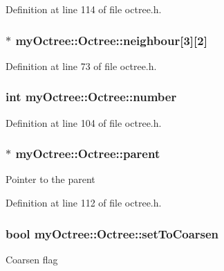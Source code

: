 Definition at line 114 of file octree.\+h.

\hypertarget{classmy_octree_1_1_octree_a667ca17260eb69985476f64fe877b626}{}
\subsubsection[{neighbour}]{$\ast$ my\+Octree\+::\+Octree\+::neighbour\mbox{[}3\mbox{]}\mbox{[}2\mbox{]}}\label{classmy_octree_1_1_octree_a667ca17260eb69985476f64fe877b626}


Definition at line 73 of file octree.\+h.

\hypertarget{classmy_octree_1_1_octree_a86d3fb8b805509bc5522b8b470d2c682}{}
\subsubsection[{number}]{\setlength{\rightskip}{0pt plus 5cm}int my\+Octree\+::\+Octree\+::number}\label{classmy_octree_1_1_octree_a86d3fb8b805509bc5522b8b470d2c682}


Definition at line 104 of file octree.\+h.

\hypertarget{classmy_octree_1_1_octree_a3a3b56d332ffeb81743005d11d3a7942}{}
\subsubsection[{parent}]{$\ast$ my\+Octree\+::\+Octree\+::parent\hspace{0.3cm}{\ttfamily [private]}}\label{classmy_octree_1_1_octree_a3a3b56d332ffeb81743005d11d3a7942}
Pointer to the parent 

Definition at line 112 of file octree.\+h.

\hypertarget{classmy_octree_1_1_octree_a4fb4740c2e6cee437bd9e6c2268a0fd2}{}
\subsubsection[{set\+To\+Coarsen}]{\setlength{\rightskip}{0pt plus 5cm}bool my\+Octree\+::\+Octree\+::set\+To\+Coarsen}\label{classmy_octree_1_1_octree_a4fb4740c2e6cee437bd9e6c2268a0fd2}
Coarsen flag 

